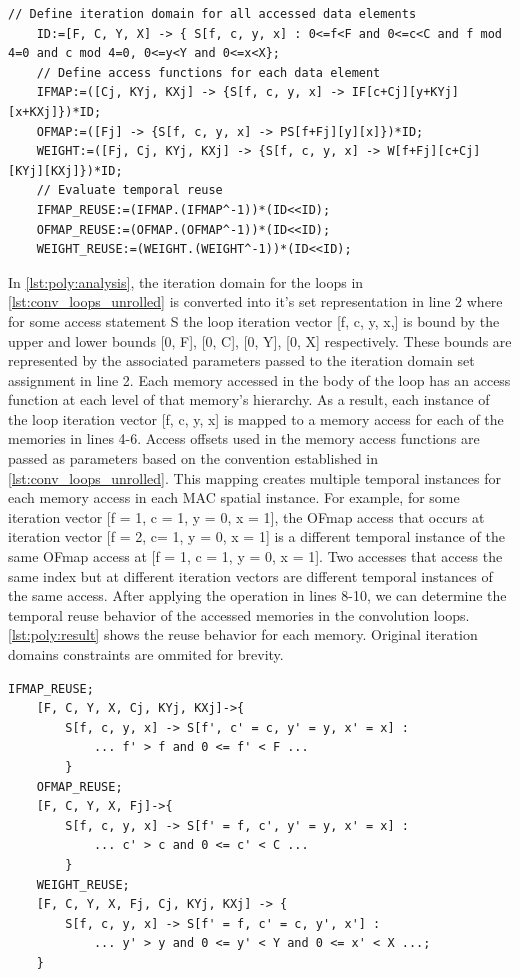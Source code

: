 \clearpage
\begin{lstlisting}[caption=Polyhedral analysis of reuse in iscc for convolution loops, label={lst:poly:analysis}]
    // Define iteration domain for all accessed data elements
    ID:=[F, C, Y, X] -> { S[f, c, y, x] : 0<=f<F and 0<=c<C and f mod 4=0 and c mod 4=0, 0<=y<Y and 0<=x<X};
    // Define access functions for each data element
    IFMAP:=([Cj, KYj, KXj] -> {S[f, c, y, x] -> IF[c+Cj][y+KYj][x+KXj]})*ID;
    OFMAP:=([Fj] -> {S[f, c, y, x] -> PS[f+Fj][y][x]})*ID;
    WEIGHT:=([Fj, Cj, KYj, KXj] -> {S[f, c, y, x] -> W[f+Fj][c+Cj][KYj][KXj]})*ID;
    // Evaluate temporal reuse
    IFMAP_REUSE:=(IFMAP.(IFMAP^-1))*(ID<<ID);
    OFMAP_REUSE:=(OFMAP.(OFMAP^-1))*(ID<<ID);
    WEIGHT_REUSE:=(WEIGHT.(WEIGHT^-1))*(ID<<ID);  

\end{lstlisting}

In \autoref{lst:poly:analysis}, the iteration domain for the loops in
\autoref{lst:conv_loops_unrolled} is converted into it's set representation in
line 2 where for some access statement S the loop iteration vector [f, c, y, x,]
is bound by the upper and lower bounds [0, F], [0, C], [0, Y], [0, X]
respectively. These bounds are represented by the associated parameters passed
to the iteration domain set assignment in line 2. Each memory accessed in the
body of the loop has an access function at each level of that memory's
hierarchy. As a result, each instance of the loop iteration vector [f, c, y, x]
is mapped to a memory access for each of the memories in lines 4-6. Access
offsets used in the memory access functions are passed as parameters based on
the convention established in \autoref{lst:conv_loops_unrolled}. This mapping
creates multiple temporal instances for each memory access in each \ac{MAC}
spatial instance.  For
example, for some iteration vector [f = 1, c = 1, y = 0, x = 1],
 the OFmap access that occurs at iteration vector [f = 2, c= 1, y = 0,
x = 1] is a different temporal instance of the same OFmap access at [f = 1, c = 1,
y = 0, x = 1]. 
Two accesses that access the same index but at different
iteration vectors are different temporal instances of the same access.
After applying the operation in lines 8-10, we can determine the
temporal reuse behavior of the accessed memories in the convolution loops.  
\autoref{lst:poly:result} shows the reuse behavior for each memory. Original
iteration domains constraints are ommited for brevity. 

\clearpage
\begin{lstlisting}[caption=Polyhedral analysis results w.r.t data elements in convolution loops, label={lst:poly:result}]
    IFMAP_REUSE;
    [F, C, Y, X, Cj, KYj, KXj]->{
        S[f, c, y, x] -> S[f', c' = c, y' = y, x' = x] :
            ... f' > f and 0 <= f' < F ... 
        }
    OFMAP_REUSE;
    [F, C, Y, X, Fj]->{ 
        S[f, c, y, x] -> S[f' = f, c', y' = y, x' = x] : 
            ... c' > c and 0 <= c' < C ... 
        }
    WEIGHT_REUSE;
    [F, C, Y, X, Fj, Cj, KYj, KXj] -> { 
        S[f, c, y, x] -> S[f' = f, c' = c, y', x'] : 
            ... y' > y and 0 <= y' < Y and 0 <= x' < X ...; 
    }
\end{lstlisting}

